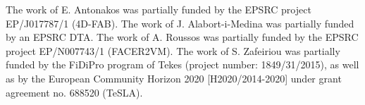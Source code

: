 \noindent 
The work of E. Antonakos was partially funded by the EPSRC project EP/J017787/1 (4D-FAB). 
The work of J. Alabort-i-Medina was partially funded by an EPSRC DTA.
The work of A. Roussos was partially funded by the EPSRC project EP/N007743/1 (FACER2VM).
The work of S. Zafeiriou was partially funded by the FiDiPro program of Tekes (project number: 1849/31/2015), as well as  by the European Community Horizon 2020 [H2020/2014-2020] under grant agreement no. 688520 (TeSLA). 

